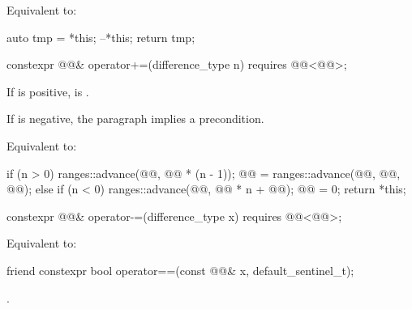 \begin{itemdescr}
\pnum
\effects
Equivalent to:
\begin{codeblock}
auto tmp = *this;
--*this;
return tmp;
\end{codeblock}
\end{itemdescr}

%
\begin{itemdecl}
constexpr @@& operator+=(difference_type n) requires @@<@@>;
\end{itemdecl}

\begin{itemdescr}
\pnum
\expects
If  is positive,
is .
\begin{note}
If  is negative, the  paragraph implies a precondition.
\end{note}

\pnum
\effects
Equivalent to:
\begin{codeblock}
if (n > 0) {
  ranges::advance(@@, @@ * (n - 1));
  @@ = ranges::advance(@@, @@, @@);
} else if (n < 0) {
  ranges::advance(@@, @@ * n + @@);
  @@ = 0;
}
return *this;
\end{codeblock}
\end{itemdescr}

%
\begin{itemdecl}
constexpr @@& operator-=(difference_type x)
  requires @@<@@>;
\end{itemdecl}

\begin{itemdescr}
\pnum
\effects
Equivalent to: 
\end{itemdescr}

%
\begin{itemdecl}
friend constexpr bool operator==(const @@& x, default_sentinel_t);
\end{itemdecl}

\begin{itemdescr}
\pnum
\returns
{}.
\end{itemdescr}

